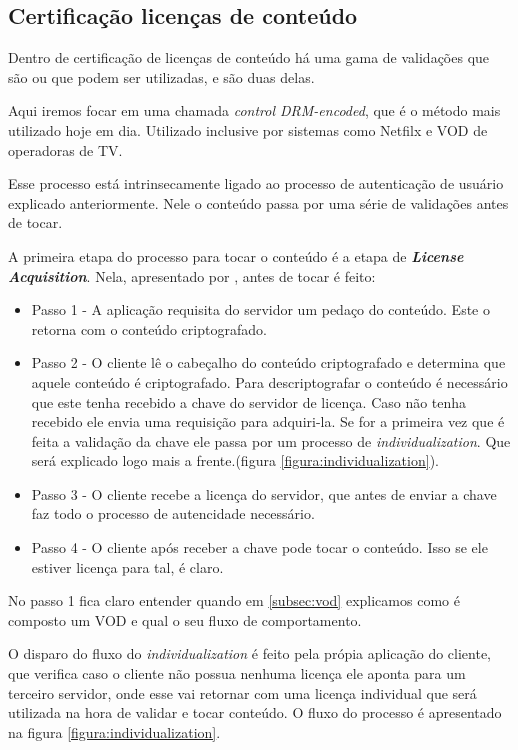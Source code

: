 \subsection{Certifica\c{c}\~ao licen\c{c}as de conte\'udo}
\label{subsection:autenticacao_conteudo}
Dentro de certifica\c{c}\~ao de licen\c{c}as de conte\'udo h\'a uma gama de valida\c{c}\~oes que s\~ao ou que podem ser utilizadas, \cite{wein2012content} e \cite{leighton2007html} s\~ao duas delas.

Aqui iremos focar em uma chamada \textit{control DRM-encoded}, que \'e o m\'etodo mais utilizado hoje em dia. Utilizado inclusive por sistemas como Netfilx e VOD de operadoras de TV.

Esse processo est\'a intrinsecamente ligado ao processo de autentica\c{c}\~ao de usu\'ario explicado anteriormente. Nele o conte\'udo passa por uma s\'erie de valida\c{c}\~oes antes de tocar.

A primeira etapa do processo para tocar o conte\'udo \'e a etapa de \textbf{\textit{License Acquisition}}. Nela, apresentado por \cite{pomelo2009analysis}, antes de tocar \'e feito:
\begin{itemize}
\item Passo 1 -  A aplica\c{c}\~ao requisita do servidor um peda\c{c}o do conte\'udo. Este o retorna com o conte\'udo criptografado.
\item Passo 2 - O cliente l\^e o cabe\c{c}alho do conte\'udo criptografado e determina que aquele conte\'udo \'e criptografado. Para descriptografar o conte\'udo \'e necess\'ario que este tenha recebido a chave do servidor de licen\c{c}a. Caso n\~ao tenha recebido ele envia uma requisi\c{c}\~ao para adquiri-la. Se for a primeira vez que \'e feita a valida\c{c}\~ao da chave ele passa por um processo de \textit{individualization}. Que ser\'a explicado logo mais a frente.(figura \ref{figura:individualization}).
\item Passo 3 - O cliente recebe a licen\c{c}a do servidor, que antes de enviar a chave faz todo o processo de autencidade necess\'ario.
\item Passo 4 - O cliente ap\'os receber a chave pode tocar o conte\'udo. Isso se ele estiver licen\c{c}a para tal, \'e claro.
\end{itemize}

No passo 1 fica claro entender quando em \ref{subsec:vod} explicamos como \'e composto um VOD e qual o seu fluxo de comportamento.

O disparo do fluxo do \textit{individualization} \'e feito pela pr\'opia aplica\c{c}\~ao do cliente, que verifica caso o cliente n\~ao possua nenhuma licen\c{c}a ele aponta para um terceiro servidor, onde esse vai retornar com uma licen\c{c}a individual que ser\'a utilizada na hora de validar e tocar conte\'udo. O fluxo do processo \'e apresentado na figura \ref{figura:individualization}. 

